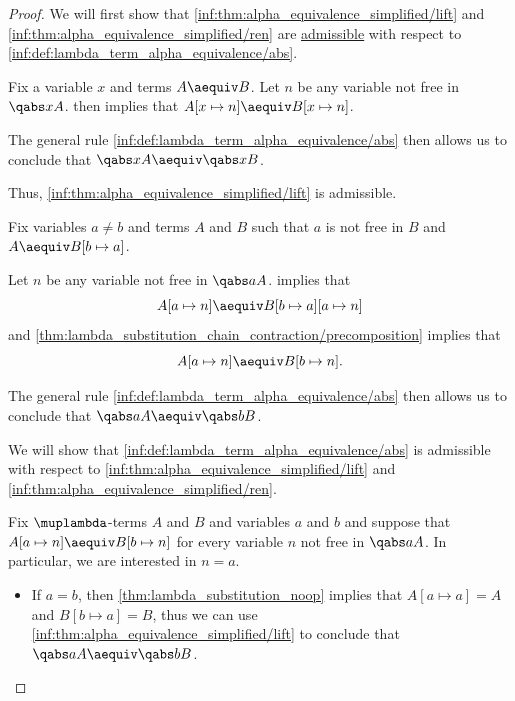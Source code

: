 \begin{proof}
  \SufficiencySubProof We will first show that \ref{inf:thm:alpha_equivalence_simplified/lift} and \ref{inf:thm:alpha_equivalence_simplified/ren} are \hyperref[con:inference_rule_admissibility]{admissible} with respect to \ref{inf:def:lambda_term_alpha_equivalence/abs}.

   Fix a variable \( x \) and terms \( A \aequiv B \). Let \( n \) be any variable not free in \( \qabs x A \).  then implies that \( A[x \mapsto n] \aequiv B[x \mapsto n] \).

  The general rule \ref{inf:def:lambda_term_alpha_equivalence/abs} then allows us to conclude that \( \qabs x A \aequiv \qabs x B \).

  Thus, \ref{inf:thm:alpha_equivalence_simplified/lift} is admissible.

   Fix variables \( a \neq b \) and terms \( A \) and \( B \) such that \( a \) is not free in \( B \) and \( A \aequiv B[b \mapsto a] \).

  Let \( n \) be any variable not free in \( \qabs a A \).  implies that
  \begin{equation*}
    A[a \mapsto n] \aequiv B[b \mapsto a][a \mapsto n]
  \end{equation*}
  and \cref{thm:lambda_substitution_chain_contraction/precomposition} implies that
  \begin{equation*}
    A[a \mapsto n] \aequiv B[b \mapsto n].
  \end{equation*}

  The general rule \ref{inf:def:lambda_term_alpha_equivalence/abs} then allows us to conclude that \( \qabs a A \aequiv \qabs b B \).

  \NecessitySubProof We will show that \ref{inf:def:lambda_term_alpha_equivalence/abs} is admissible with respect to \ref{inf:thm:alpha_equivalence_simplified/lift} and \ref{inf:thm:alpha_equivalence_simplified/ren}.

  Fix \( \muplambda \)-terms \( A \) and \( B \) and variables \( a \) and \( b \) and suppose that \( A[a \mapsto n] \aequiv B[b \mapsto n] \) for every variable \( n \) not free in \( \qabs a A \). In particular, we are interested in \( n = a \).

  \begin{itemize}
    \item If \( a = b \), then \cref{thm:lambda_substitution_noop} implies that \( A[a \mapsto a] = A \) and \( B[b \mapsto a] = B \), thus we can use \ref{inf:thm:alpha_equivalence_simplified/lift} to conclude that \( \qabs a A \aequiv \qabs b B \).


\end{itemize}
\end{proof}
